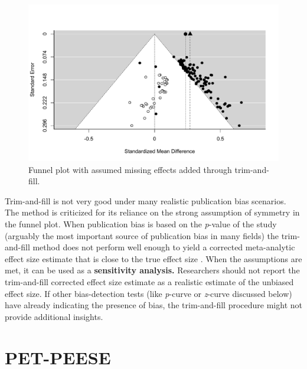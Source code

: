 \documentclass[
  oneside]{book}
\begin{document}
\begin{figure}

{\centering \includegraphics[width=1\linewidth]{12-bias_files/figure-latex/trimfill1-1} 

}

\caption{Funnel plot with assumed missing effects added through trim-and-fill.}\label{fig:trimfill1}
\end{figure}

Trim-and-fill is not very good under many realistic publication bias scenarios. The method is criticized for its reliance on the strong assumption of symmetry in the funnel plot. When publication bias is based on the \emph{p}-value of the study (arguably the most important source of publication bias in many fields) the trim-and-fill method does not perform well enough to yield a corrected meta-analytic effect size estimate that is close to the true effect size \citep{peters_performance_2007, terrin_adjusting_2003}. When the assumptions are met, it can be used as a \textbf{sensitivity analysis.} Researchers should not report the trim-and-fill corrected effect size estimate as a realistic estimate of the unbiased effect size. If other bias-detection tests (like \emph{p}-curve or \emph{z}-curve discussed below) have already indicating the presence of bias, the trim-and-fill procedure might not provide additional insights.

\hypertarget{pet-peese}{%
\section{PET-PEESE}\label{pet-peese}}
\end{document}
